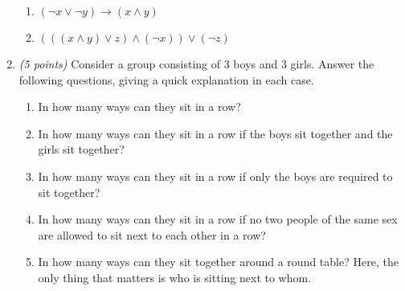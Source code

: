 \documentclass[12pt]{article}
\begin{document}
\begin{enumerate}[label=\textbf{\arabic*.}, itemsep=1.2em]
\begin{enumerate}[label=\textbf{\alph*.}, itemsep=0.8em]
    \item \((\neg x \vee \neg y) \to (x \wedge y)\) \newline
    
    \item \((((x \wedge y) \vee z) \wedge (\neg x)) \vee (\neg z)\) \newline
    
\end{enumerate}

\item \emph{(5 points)} Consider a group consisting of 3 boys and 3 girls. Answer the following questions, giving a quick explanation in each case.

\begin{enumerate}[label=\textbf{\alph*.}, itemsep=0.8em]
    \item In how many ways can they sit in a row? \newline
    
    \item In how many ways can they sit in a row if the boys sit together and the girls sit together? \newline
    
    \item In how many ways can they sit in a row if only the boys are required to sit together? \newline

    \item In how many ways can they sit in a row if no two people of the same sex are allowed to sit next to each other in a row? \newline

    \item In how many ways can they sit together around a round table? Here, the only thing that matters is who is sitting next to whom. \newline
\end{enumerate}

\end{enumerate}
\newpage %
\end{document}
